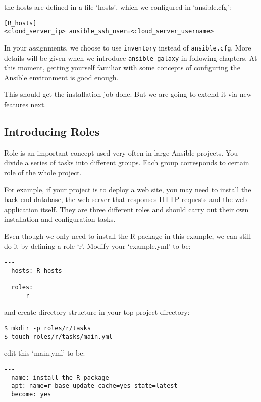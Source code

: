 the hosts are defined in a file `hosts', which we configured in
`ansible.cfg':

\begin{verbatim}
[R_hosts]
<cloud_server_ip> ansible_ssh_user=<cloud_server_username>
\end{verbatim}

In your assignments, we choose to use \texttt{inventory} instead of
\texttt{ansible.cfg}. More details will be given when we introduce
\texttt{ansible-galaxy} in following chapters. At this moment, getting
yourself familiar with some concepts of configuring the Ansible
environment is good enough.

This should get the installation job done. But we are going to extend it
via new features next.

\subsection{Introducing Roles}\label{introducing-roles}

Role is an important concept used very often in large Ansible projects.
You divide a series of tasks into different groups. Each group
corresponds to certain role of the whole project.

For example, if your project is to deploy a web site, you may need to
install the back end database, the web server that responses HTTP
requests and the web application itself. They are three different roles
and should carry out their own installation and configuration tasks.

Even though we only need to install the R package in this example, we
can still do it by defining a role `r'. Modify your `example.yml' to be:

\begin{verbatim}
---
- hosts: R_hosts

  roles:
    - r
\end{verbatim}

and create directory structure in your top project directory:

\begin{verbatim}
$ mkdir -p roles/r/tasks
$ touch roles/r/tasks/main.yml
\end{verbatim}

edit this `main.yml' to be:

\begin{verbatim}
---
- name: install the R package
  apt: name=r-base update_cache=yes state=latest
  become: yes
\end{verbatim}

